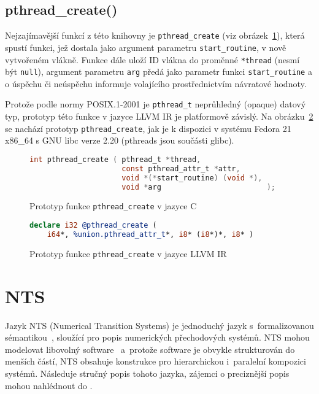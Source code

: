 \documentclass{fithesis2}
\begin{document}
\subsection{pthread_create()}
Nejzajímavější funkcí z této knihovny je \texttt{pthread\_create}\cite{man-pthread-create} (viz obrázek~\ref{fig:pthread-create-c}), která spustí funkci, jež dostala jako argument parametru \texttt{start\_routine}, v nově vytvořeném vlákně. Funkce dále uloží ID vlákna do proměnné \texttt{*thread} (nesmí být \texttt{null}), argument parametru \texttt{arg} předá jako parametr funkci \texttt{start\_routine} a o úspěchu či neúspěchu informuje volajícího prostřednictvím návratové hodnoty.

Protože podle normy POSIX.1-2001  je \texttt{pthread\_t} neprůhledný (opaque) datový typ, prototyp této funkce v jazyce LLVM IR je platformově závislý. Na obrázku~\ref{fig:pthread-create-llvm} se nachází prototyp \texttt{pthread\_create}, jak je k dispozici v systému Fedora 21 x86_64 s GNU libc verze 2.20 (pthreads jsou součásti glibc).

\begin{figure}[h!]
\begin{lstlisting}[language=C]
int pthread_create ( pthread_t *thread,
                     const pthread_attr_t *attr,
                     void *(*start_routine) (void *),
                     void *arg                        );
\end{lstlisting}
\label{fig:pthread-create-c}
\caption{Prototyp funkce \texttt{pthread_create} v jazyce C}
\end{figure}

\begin{figure}[h!]
\begin{lstlisting}[language=llvm]
declare i32 @pthread_create (
	i64*, %union.pthread_attr_t*, i8* (i8*)*, i8* )
\end{lstlisting}
\label{fig:pthread-create-llvm}
\caption{Prototyp funkce \texttt{pthread_create} v jazyce LLVM IR}
\end{figure}

\section{NTS}
Jazyk NTS (Numerical Transition Systems) je jednoduchý jazyk s~formalizovanou sémantikou~\cite{NTSref}, sloužící pro popis numerických přechodových systémů. NTS mohou modelovat libovolný software~\cite{NTSref} a~protože software je obvykle strukturován do menších částí, NTS obsahuje konstrukce pro hierarchickou i~paralelní kompozici systémů. Následuje stručný popis tohoto jazyka, zájemci o preciznější popis mohou nahlédnout do \cite{NTSref}.
\end{document}
